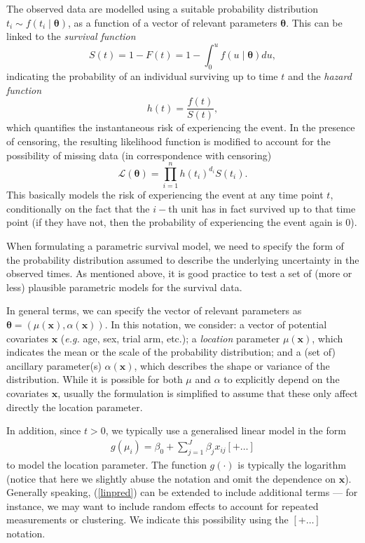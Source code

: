 \documentclass[article,nojss]{jss}
\newcommand{\eg}{{\em e.g.\/}\xspace}
\begin{document}
The observed data are modelled using a suitable probability distribution $t_i \sim f(t_i\mid \bm\theta)$, as a function of a vector of relevant parameters $\bm\theta$. This can be linked to the \textit{survival function} 
\[ S(t) = 1-F(t) = 1 - \int_0^u f(u\mid\bm\theta)du, \]
indicating the probability of an individual surviving up to time $t$ and the \textit{hazard function}
\[ h(t) = \frac{f(t)}{S(t)}, \]
which quantifies the instantaneous risk of experiencing the event. In the presence of censoring, the resulting likelihood function is modified to account for the possibility of missing data (in correspondence with censoring)
\[ \mathcal{L}(\bm\theta) = \prod_{i=1}^n h(t_i)^{d_i}S(t_i). \]
This basically models the risk of experiencing the event at any time point $t$, conditionally on the fact that the $i-$th unit has in fact survived up to that time point (if they have not, then the probability of experiencing the event again is 0).

When formulating a parametric survival model, we need to specify the form of the probability distribution assumed to describe the underlying uncertainty in the observed times. As mentioned above, it is good practice to test a set of (more or less) plausible parametric models for the survival data. 

In general terms, we can specify the vector of relevant parameters as $\bm\theta=\left(\mu(\bm{x}),\alpha(\bm{x})\right)$. In this notation, we consider: a vector of potential covariates $\bm{x}$ (\eg age, sex, trial arm, etc.); a \textit{location} parameter $\mu(\bm{x})$, which indicates the mean or the scale of the probability distribution; and a (set of) ancillary parameter(s) $\alpha(\bm{x})$, which describes the shape or variance of the distribution. While it is possible for both $\mu$ and $\alpha$ to explicitly depend on the covariates $\bm{x}$, usually the formulation is simplified to assume that these only affect directly the location parameter.

In addition, since $t>0$, we typically use a generalised linear model in the form
\begin{eqnarray} 
g(\mu_i) = \beta_0 + \sum_{j=1}^J \beta_j x_{ij} [+ \ldots]  \label{linpred}
\end{eqnarray}
to model the location parameter. The function $g(\cdot)$ is typically the logarithm (notice that here we slightly abuse the notation and omit the dependence on $\bm{x}$). Generally speaking, (\ref{linpred}) can be extended to include additional terms --- for instance, we may want to include random effects to account for repeated measurements or clustering. We indicate this possibility using the $[+ \ldots]$ notation.
\end{document}
